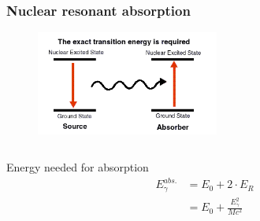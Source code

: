 	\begin{frame}[t]
		\frametitle{Nuclear resonant absorption}
		
		\begin{figure}
			\includegraphics[width=6cm]{images/transition.png}
		\end{figure}
		
		\begin{columns}
			\begin{column}{0.48\linewidth}
				\begin{block}{Energy needed for absorption}
					\begin{eqnarray*}
						E_{\gamma}^{abs.}&=E_0 + 2 \cdot E_R\\
						&=E_0 + \frac{E_{\gamma}^2}{Mc^2}
					\end{eqnarray*}
				\end{block}
			\end{column}
		\end{columns}
		
	\end{frame}

